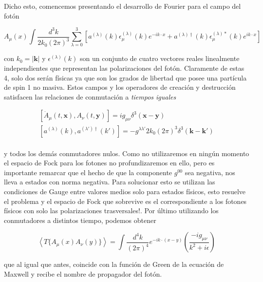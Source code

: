 \documentclass{article}
\numberwithin{equation}{section}
\begin{document}
Dicho esto, comencemos presentando el desarrollo de Fourier para el campo del fotón

\begin{equation}
A_{\mu}(x) \int \frac{d^3k}{2k_0(2\pi)^3} \sum_{\lambda=0}^3 \left[a^{(\lambda)}(k)\epsilon_{\mu}^{(\lambda)}(k)e^{-ik\cdot x} + a^{(\lambda)\dagger}(k)\epsilon_{\mu}^{(\lambda)*}(k)e^{ik\cdot x} \right]
\end{equation}

con $ k_0 = | \mathbf{k} | $ y $ \epsilon^{(\lambda)}(k) $ son un conjunto de cuatro vectores reales linealmente independientes que representan las polarizaciones del fotón. Claramente de estas 4, solo dos serán físicas ya que son los grados de libertad que posee una partícula de spin 1 no masiva. Estos campos y los operadores de creación y destrucción satisfacen las relaciones de conmutación a \textit{tiempos iguales}

\begin{equation}
\begin{aligned}
\left[\dot{A}_{\mu}(t,\mathbf{x}),A_{\nu}(t,\mathbf{y})\right]=ig_{\mu \nu}\delta^3(\mathbf{x} - \mathbf{y})\\
\left[a^{(\lambda)}(k),a^{(\lambda')\dagger}(k')\right]=-g^{\lambda \lambda'}2k_0(2\pi)^3\delta^3(\mathbf{k} - \mathbf{k'})\\
\end{aligned}
\end{equation}

y todos los demás conmutadores nulos. Como no utilizaremos en ningún momento el espacio de Fock para los fotones no profundizaremos en ello, pero es importante remarcar que el hecho de que la componente $ g^{00} $ sea negativa, nos lleva a estados con norma negativa. Para solucionar esto se utilizan las condiciones de Gauge entre valores medios solo para estados físicos, esto resuelve el problema y el espacio de Fock que sobrevive es el correspondiente a los fotones físicos con solo las polarizaciones trasversales!. Por último utilizando los conmutadores a distintos tiempo, podemos obtener

\begin{equation}\label{prop_foton}
\left\langle T\{A_{\mu}(x)A_{\nu}(y)\} \right\rangle =\int\frac{d^{4}k}{(2\pi)^{4}}e^{-ik\cdot(x-y)}\left(\frac{-ig_{\mu\nu}}{k^2 +i\epsilon}\right)
\end{equation}

que al igual que antes, coincide con la función de Green de la ecuación de Maxwell y recibe el nombre de propagador del fotón.\\
\end{document}
